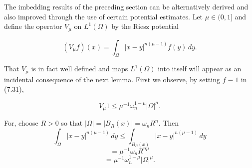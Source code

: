 The imbedding results of the preceding section can be alternatively derived and
also improved through the use of certain potential estimates. Let $\mu \in (0,1]$
and define the operator $V_\mu$ on $L^1(\Omega)$ by the Riesz potential

\begin{equation}
(V_\mu f)(x)=\int_\Omega |x-y|^{n(\mu-1)}f(y)\,dy.
\tag{7.31}
\end{equation}

That $V_\mu$ is in fact well defined and maps $L^1(\Omega)$ into itself will appear as an incidental
consequence of the next lemma. First we observe, by setting $f \equiv 1$ in (7.31),

\begin{equation}
V_\mu 1 \le \mu^{-1}\omega_n^{1-\mu}|\Omega|^\mu.
\tag{7.32}
\end{equation}

For, choose $R>0$ so that $|\Omega|=|B_R(x)|=\omega_n R^n$. Then
\[
\int_\Omega |x-y|^{n(\mu-1)}\,dy \le \int_{B_R(x)} |x-y|^{n(\mu-1)}\,dy
\]
\[
=\mu^{-1}\omega_n R^{n\mu}
\]
\[
=\mu^{-1}\omega_n^{1-\mu}|\Omega|^\mu.
\]

